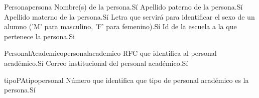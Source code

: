 \begin{cdtEntidad}{Persona}{persona}
	{Nombre(s) de la persona.}{Sí}
	{Apellido paterno de la persona.}{Sí}
	{Apellido materno de la persona.}{Sí}
	{Letra que servirá para identificar el sexo de un alumno ('M' para masculino, 'F' para femenino).}{Sí}
	{Id de la escuela a la que pertenece la persona.}{Si}
\end{cdtEntidad}
\begin{cdtEntidad}{PersonalAcademico}{personalacademico}
	{RFC que identifica al personal académico.}{Sí}
	{Correo institucional del personal académico.}{Sí}
\end{cdtEntidad}
\begin{cdtEntidad}{tipoPA}{tipopersonal}
	{Número que identifica que tipo de personal académico es la persona.}{Sí}
\end{cdtEntidad}
